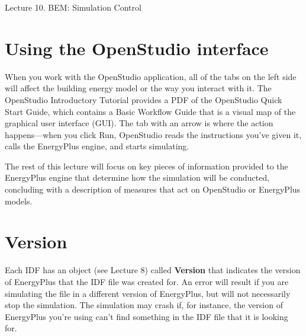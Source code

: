 \documentclass[10pt]{article}
\begin{document}
   \noindent
   \begin{center}

   \hrulefill
   
   \vspace{5pt}
   
   \vspace{0pt}
   
   {\Large \hfill  Lecture 10. BEM: Simulation Control}
   \vspace{5pt}
   
  
   \hrulefill
   \end{center}

   {}


\section{Using the OpenStudio interface}

When you work with the OpenStudio application, all of the tabs on the left side will affect the building energy model or the way you interact with it.
The OpenStudio Introductory Tutorial \cite{noauthor_undated-fr} provides a PDF of the OpenStudio Quick Start Guide, which contains a Basic Workflow Guide that is a visual map of the graphical user interface (GUI).  The tab with an arrow is where the action happens---when you click Run, OpenStudio reads the instructions you've given it, calls the EnergyPlus engine, and starts simulating.

The rest of this lecture will focus on key pieces of information provided to the EnergyPlus engine that determine how the simulation will be conducted, concluding with a description of measures that act on OpenStudio or EnergyPlus models. 

\section{Version}

Each IDF has an object (see Lecture 8) called \textbf{Version} that indicates the version of EnergyPlus that the IDF file was created for. An error will result if you are simulating the file in a different version of EnergyPlus, but will not necessarily stop the simulation. The simulation may crash if, for instance, the version of EnergyPlus you're using can't find something in the IDF file that it is looking for.
\end{document}
